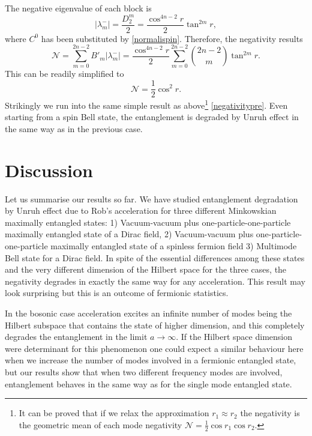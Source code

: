 The negative eigenvalue of each block is
\begin{equation}\label{neigen2}
|\lambda^-_m|=\frac{D_2^m}{2}=\frac{\cos^{4n-2}r}{2}\tan^{2m}r,
\end{equation}
where $C^0$ has been substituted by \eqref{normalispin}. Therefore, the negativity results
\begin{equation}\label{negativity2pre}
\mathcal{N}=\sum_{m=0}^{2n-2} B'_m|\lambda^-_m| =\frac{\cos^{4n-2}r}{2}\sum_{m=0}^{2n-2}\binom{2n-2}{m}  \tan^{2m}r.
\end{equation}
This can be readily simplified to
\begin{equation}\label{negativity2pre}
\mathcal{N}= \frac12\cos^2 r.
\end{equation}
Strikingly we run into the same simple result as above\footnote{It can be proved that if we relax the approximation $r_1\approx r_2$ the negativity is the geometric mean of each mode negativity $\mathcal{N}=\frac12\cos r_1\cos r_2$.} \eqref{negativitypre}. Even starting from a spin Bell state, the entanglement is degraded by Unruh effect in the same way as in the previous case.


\section{Discussion}

Let us summarise our results so far. We have studied entanglement degradation by Unruh effect due to Rob's acceleration for  three different Minkowskian maximally entangled states: 1) Vacuum-vacuum plus one-particle-one-particle maximally entangled state of a Dirac field, 2) Vacuum-vacuum plus one-particle-one-particle maximally entangled state of a spinless fermion field 3) Multimode Bell state for a Dirac field. In spite of the essential differences among these states and the very different dimension of the Hilbert space for the three cases, the negativity degrades in exactly the same way for any acceleration. This result may look surprising but this is an outcome of fermionic statistics.

In the bosonic case acceleration excites an infinite number of modes being the Hilbert subspace that contains the state of higher dimension, and this completely degrades the entanglement in the limit $a\rightarrow\infty$. If the Hilbert space dimension were determinant for this phenomenon one could expect a similar behaviour here when we increase the number of modes involved in a fermionic entangled state, but our results show that  when two different frequency modes are involved, entanglement behaves in the same way as for the single mode entangled state. 

